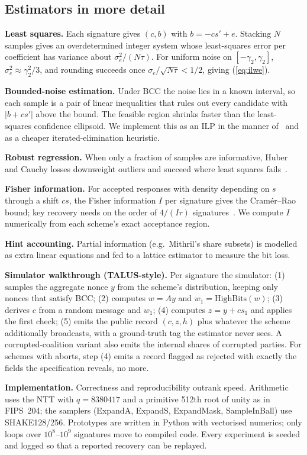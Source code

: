 \documentclass[10pt,conference,a4paper]{IEEEtran}
\newcommand{\HB}{\mathrm{HighBits}}
\begin{document}
\subsection{Estimators in more detail}
\textbf{Least squares.} Each signature gives $(c,b)$ with $b=-cs'+e$. Stacking $N$ samples gives an overdetermined integer
system whose least-squares error per coefficient has variance about $\sigma_e^2/(N\tau)$. For uniform noise on
$[-\gamma_2,\gamma_2]$, $\sigma_e^2\approx\gamma_2^2/3$, and rounding succeeds once $\sigma_e/\sqrt{N\tau}<1/2$, giving
(\ref{eq:ilwe}).

\textbf{Bounded-noise estimation.} Under BCC the noise lies in a known interval, so each sample is a pair of linear
inequalities that rules out every candidate with $|b+cs'|$ above the bound. The feasible region shrinks faster than the
least-squares confidence ellipsoid. We implement this as an ILP in the manner of~\cite{rejected} and as a cheaper
iterated-elimination heuristic.

\textbf{Robust regression.} When only a fraction of samples are informative, Huber and Cauchy losses downweight outliers
and succeed where least squares fails~\cite{concealed}.

\textbf{Fisher information.} For accepted responses with density depending on $s$ through a shift $cs$, the Fisher
information $I$ per signature gives the Cram\'er--Rao bound; key recovery needs on the order of $4/(I\tau)$
signatures~\cite{talus}. We compute $I$ numerically from each scheme's exact acceptance region.

\textbf{Hint accounting.} Partial information (e.g.\ Mithril's share subsets) is modelled as extra linear equations and
fed to a lattice estimator to measure the bit loss.

\textbf{Simulator walkthrough (TALUS-style).} Per signature the simulator: (1) samples the aggregate nonce $y$ from the
scheme's distribution, keeping only nonces that satisfy BCC; (2) computes $w=Ay$ and $w_1=\HB(w)$; (3) derives $c$ from a
random message and $w_1$; (4) computes $z=y+cs_1$ and applies the first check; (5) emits the public record $(c,z,h)$ plus
whatever the scheme additionally broadcasts, with a ground-truth tag the estimator never sees. A corrupted-coalition
variant also emits the internal shares of corrupted parties. For schemes with aborts, step (4) emits a record flagged as
rejected with exactly the fields the specification reveals, no more.

\textbf{Implementation.} Correctness and reproducibility outrank speed. Arithmetic uses the NTT with $q=8380417$ and a
primitive 512th root of unity as in FIPS~204; the samplers (ExpandA, ExpandS, ExpandMask, SampleInBall) use SHAKE128/256.
Prototypes are written in Python with vectorised numerics; only loops over $10^8$--$10^9$ signatures move to compiled
code. Every experiment is seeded and logged so that a reported recovery can be replayed.
\end{document}
